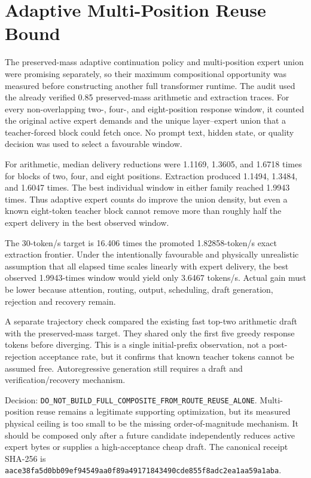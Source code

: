 \section{Adaptive Multi-Position Reuse Bound}
\label{sec:gptoss120b-adaptive-block-bound-20260911}

The preserved-mass adaptive continuation policy and multi-position expert
union were promising separately, so their maximum compositional opportunity
was measured before constructing another full transformer runtime.  The audit
used the already verified 0.85 preserved-mass arithmetic and extraction traces.
For every non-overlapping two-, four-, and eight-position response window, it
counted the original active expert demands and the unique layer--expert union
that a teacher-forced block could fetch once.  No prompt text, hidden state, or
quality decision was used to select a favourable window.

For arithmetic, median delivery reductions were 1.1169, 1.3605, and 1.6718
times for blocks of two, four, and eight positions.  Extraction produced
1.1494, 1.3484, and 1.6047 times.  The best individual window in either family
reached 1.9943 times.  Thus adaptive expert counts do improve the union density,
but even a known eight-token teacher block cannot remove more than roughly half
the expert delivery in the best observed window.

The 30-token/s target is 16.406 times the promoted 1.82858-token/s exact
extraction frontier.  Under the intentionally favourable and physically
unrealistic assumption that all elapsed time scales linearly with expert
delivery, the best observed 1.9943-times window would yield only 3.6467
tokens/s.  Actual gain must be lower because attention, routing, output,
scheduling, draft generation, rejection and recovery remain.

A separate trajectory check compared the existing fast top-two arithmetic
draft with the preserved-mass target.  They shared only the first five greedy
response tokens before diverging.  This is a single initial-prefix observation,
not a post-rejection acceptance rate, but it confirms that known teacher tokens
cannot be assumed free.  Autoregressive generation still requires a draft and
verification/recovery mechanism.

Decision:
\texttt{DO\_NOT\_BUILD\_FULL\_COMPOSITE\_FROM\_ROUTE\_REUSE\_ALONE}.
Multi-position reuse remains a legitimate supporting optimization, but its
measured physical ceiling is too small to be the missing order-of-magnitude
mechanism.  It should be composed only after a future candidate independently
reduces active expert bytes or supplies a high-acceptance cheap draft.  The
canonical receipt SHA-256 is
\texttt{aace38fa5d0bb09ef94549aa0f89a49171843490cde855f8adc2ea1aa59a1aba}.
